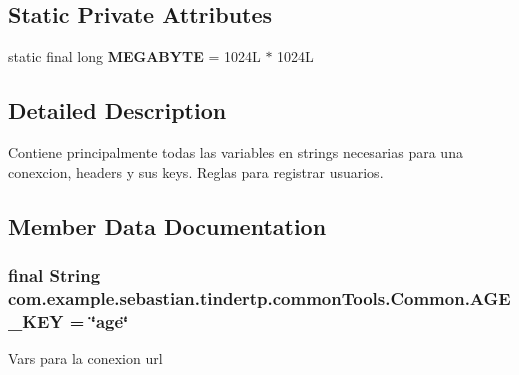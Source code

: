 \subsection*{Static Private Attributes}
\begin{DoxyCompactItemize}
\item 
static final long {\bfseries M\+E\+G\+A\+B\+Y\+TE} = 1024\+L $\ast$ 1024L\hypertarget{classcom_1_1example_1_1sebastian_1_1tindertp_1_1commonTools_1_1Common_a2d34a6eb47d9949b171c61f5191667e8}{}\label{classcom_1_1example_1_1sebastian_1_1tindertp_1_1commonTools_1_1Common_a2d34a6eb47d9949b171c61f5191667e8}

\end{DoxyCompactItemize}


\subsection{Detailed Description}
Contiene principalmente todas las variables en strings necesarias para una conexcion, headers y sus keys. Reglas para registrar usuarios. 

\subsection{Member Data Documentation}
\subsubsection[{\texorpdfstring{A\+G\+E\+\_\+\+K\+EY}{AGE\_KEY}}]{\setlength{\rightskip}{0pt plus 5cm}final String com.\+example.\+sebastian.\+tindertp.\+common\+Tools.\+Common.\+A\+G\+E\+\_\+\+K\+EY = \char`\"{}age\char`\"{}\hspace{0.3cm}{\ttfamily [static]}}\hypertarget{classcom_1_1example_1_1sebastian_1_1tindertp_1_1commonTools_1_1Common_a659946a530f7152a828e547f39259dc6}{}\label{classcom_1_1example_1_1sebastian_1_1tindertp_1_1commonTools_1_1Common_a659946a530f7152a828e547f39259dc6}
Vars para la conexion url 
